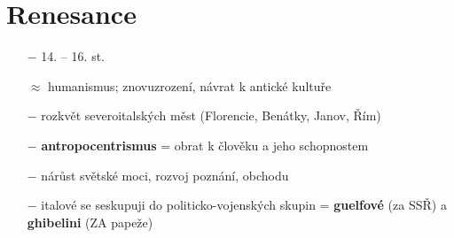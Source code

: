 \documentclass{article}
\begin{document}
\section*{Renesance}
\begin{itemize}
    \vspace{-0.5em}
    \setlength\itemsep{0.15em}
    \item[$-$] 14. – 16. st.
    \item[$\approx$] humanismus; znovuzrození, návrat k antické kultuře
    \item[$-$] rozkvět severoitalských měst (Florencie, Benátky, Janov, Řím)
    \item[$-$] \textbf{antropocentrismus} = obrat k člověku a jeho schopnostem
    \item[$-$] nárůst světské moci, rozvoj poznání, obchodu
    \item[$-$] italové se seskupuji do politicko-vojenských skupin = \textbf{guelfové} (za SSŘ) a \textbf{ghibelini} (ZA papeže)
\end{itemize}
\end{document}
